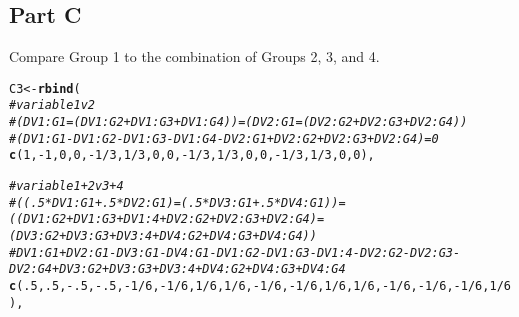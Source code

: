 \documentclass{article}\usepackage[]{graphicx}\usepackage[]{color}
\makeatletter
\newcommand{\hlnum}[1]{\textcolor[rgb]{0.686,0.059,0.569}{#1}}%
\newcommand{\hlcom}[1]{\textcolor[rgb]{0.678,0.584,0.686}{\textit{#1}}}%
\newcommand{\hlopt}[1]{\textcolor[rgb]{0,0,0}{#1}}%
\newcommand{\hlstd}[1]{\textcolor[rgb]{0.345,0.345,0.345}{#1}}%
\newcommand{\hlkwb}[1]{\textcolor[rgb]{0.69,0.353,0.396}{#1}}%
\newcommand{\hlkwd}[1]{\textcolor[rgb]{0.737,0.353,0.396}{\textbf{#1}}}%
\newenvironment{kframe}{%
 \def\at@end@of@kframe{}%
 \ifinner\ifhmode%
  \def\at@end@of@kframe{\end{minipage}}%
  \begin{minipage}{\columnwidth}%
 \fi\fi%
 \def\FrameCommand##1{\hskip\@totalleftmargin \hskip-\fboxsep
 \colorbox{shadecolor}{##1}\hskip-\fboxsep
     \hskip-\linewidth \hskip-\@totalleftmargin \hskip\columnwidth}%
 \MakeFramed {\advance\hsize-\width
   \@totalleftmargin\z@ \linewidth\hsize
   \@setminipage}}%
 {\par\unskip\endMakeFramed%
 \at@end@of@kframe}
\newenvironment{knitrout}{}{} %
\makeatother
\begin{document}
\subsection{Part C}
Compare Group 1 to the combination of Groups 2, 3, and 4.
\begin{knitrout}
\color{fgcolor}\begin{kframe}
\begin{alltt}
\hlstd{C3} \hlkwb{<-} \hlkwd{rbind}\hlstd{(}
  \hlcom{# variable 1 v 2}
  \hlcom{# (DV1:G1 = (DV1:G2 + DV1:G3 + DV1:G4)) = (DV2:G1 = (DV2:G2 + DV2:G3 + DV2:G4))}
  \hlcom{# (DV1:G1 - DV1:G2 - DV1:G3 - DV1:G4 - DV2:G1 + DV2:G2 + DV2:G3 + DV2:G4) = 0}
  \hlkwd{c}\hlstd{(}\hlnum{1}\hlstd{,}\hlopt{-}\hlnum{1}\hlstd{,}\hlnum{0}\hlstd{,}\hlnum{0}\hlstd{,} \hlopt{-}\hlnum{1}\hlopt{/}\hlnum{3}\hlstd{,}\hlnum{1}\hlopt{/}\hlnum{3}\hlstd{,}\hlnum{0}\hlstd{,}\hlnum{0}\hlstd{,} \hlopt{-}\hlnum{1}\hlopt{/}\hlnum{3}\hlstd{,}\hlnum{1}\hlopt{/}\hlnum{3}\hlstd{,}\hlnum{0}\hlstd{,}\hlnum{0}\hlstd{,} \hlopt{-}\hlnum{1}\hlopt{/}\hlnum{3}\hlstd{,}\hlnum{1}\hlopt{/}\hlnum{3}\hlstd{,}\hlnum{0}\hlstd{,}\hlnum{0}\hlstd{),}

  \hlcom{# variable 1 + 2 v 3 + 4}
  \hlcom{# ((.5*DV1:G1 + .5*DV2:G1) = (.5*DV3:G1 + .5*DV4:G1)) = ((DV1:G2 + DV1:G3 + DV1:4 + DV2:G2 + DV2:G3 + DV2:G4) = (DV3:G2 + DV3:G3 + DV3:4 + DV4:G2 + DV4:G3 + DV4:G4))}
  \hlcom{# DV1:G1 + DV2:G1 - DV3:G1 - DV4:G1 - DV1:G2 -  DV1:G3 - DV1:4 - DV2:G2 - DV2:G3 - DV2:G4 + DV3:G2 + DV3:G3 + DV3:4 + DV4:G2 + DV4:G3 + DV4:G4}
  \hlkwd{c}\hlstd{(}\hlnum{.5}\hlstd{,}\hlnum{.5}\hlstd{,}\hlopt{-}\hlnum{.5}\hlstd{,}\hlopt{-}\hlnum{.5}\hlstd{,} \hlopt{-}\hlnum{1}\hlopt{/}\hlnum{6}\hlstd{,}\hlopt{-}\hlnum{1}\hlopt{/}\hlnum{6}\hlstd{,}\hlnum{1}\hlopt{/}\hlnum{6}\hlstd{,}\hlnum{1}\hlopt{/}\hlnum{6}\hlstd{,} \hlopt{-}\hlnum{1}\hlopt{/}\hlnum{6}\hlstd{,}\hlopt{-}\hlnum{1}\hlopt{/}\hlnum{6}\hlstd{,}\hlnum{1}\hlopt{/}\hlnum{6}\hlstd{,}\hlnum{1}\hlopt{/}\hlnum{6}\hlstd{,} \hlopt{-}\hlnum{1}\hlopt{/}\hlnum{6}\hlstd{,}\hlopt{-}\hlnum{1}\hlopt{/}\hlnum{6}\hlstd{,}\hlopt{-}\hlnum{1}\hlopt{/}\hlnum{6}\hlstd{,}\hlnum{1}\hlopt{/}\hlnum{6}\hlstd{),}


\end{alltt}
\end{kframe}
\end{knitrout}
\end{document}
